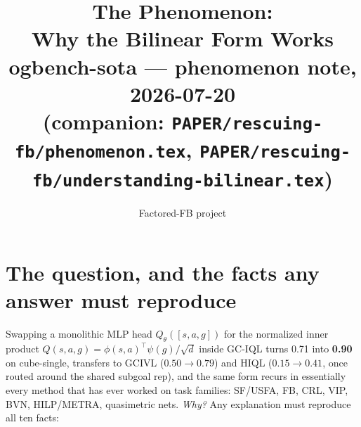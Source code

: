 \documentclass[11pt]{article}
\title{The Phenomenon:\\ Why the Bilinear Form Works\\
\large ogbench-sota --- phenomenon note, 2026-07-20\\
\normalsize (companion: \texttt{PAPER/rescuing-fb/phenomenon.tex},
\texttt{PAPER/rescuing-fb/understanding-bilinear.tex})}
\author{Factored-FB project}
\date{}
\newcommand{\numgood}[1]{\textbf{\textcolor{green!45!black}{#1}}}
\theoremstyle{definition}
\theoremstyle{remark}
\begin{document}
\maketitle

\section{The question, and the facts any answer must reproduce}\label{sec:facts}

Swapping a monolithic MLP head $Q_\theta([s,a,g])$ for the normalized inner product
$Q(s,a,g)=\phi(s,a)^\top\psi(g)/\sqrt d$ inside GC-IQL turns 0.71 into
\numgood{0.90} on cube-single, transfers to GCIVL ($0.50\to0.79$) and HIQL
($0.15\to0.41$, once routed around the shared subgoal rep), and the same form recurs in
essentially every method that has ever worked on task families: SF/USFA, FB, CRL, VIP, BVN,
HILP/METRA, quasimetric nets. \emph{Why?} Any explanation must reproduce all ten facts:
\end{document}

